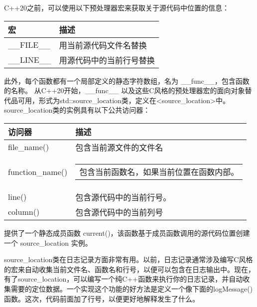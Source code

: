 

C++20之前，可以使用以下预处理器宏来获取关于源代码中位置的信息：

\begin{longtable}{|l|l|}
\hline
\textbf{宏} & \textbf{描述}                                     \\ \hline
\endfirsthead
%
\endhead
%
\_\_FILE\_\_   & 用当前源代码文件名替换
           \\ \hline
\_\_LINE\_\_   & 用源代码中的当前行号替换
 \\ \hline
\end{longtable}

此外，每个函数都有一个局部定义的静态字符数组，名为 \_\_func\_\_，包含函数的名称。
从C++20开始，\_\_func\_\_ 以及这些C风格的预处理器宏的面向对象替代品可用，形式为std::source\_location类，定义在<source\_location>中。source\_location类的实例具有以下公共访问器：


\begin{longtable}{|l|l|}
\hline
\textbf{访问器} & \textbf{描述}                                  \\ \hline
\endfirsthead
%
\endhead
%
file\_name()      & 包含当前源文件的文件名             \\ \hline
function\_name() & \begin{tabular}[c]{@{}l@{}}包含当前函数名，如果当前位置在函数内部。
\end{tabular} \\ \hline
line()            & 包含源代码中的当前行号。
  \\ \hline
column()          & 包含源代码中的当前列号
 \\ \hline
\end{longtable}

提供了一个静态成员函数 current()，该函数基于成员函数调用的源代码位置创建一个 source\_location 实例。


source\_location类在日志记录方面非常有用。以前，日志记录通常涉及编写C风格的宏来自动收集当前文件名、函数名和行号，以便可以包含在日志输出中。现在，有了source\_location，可以编写一个纯C++函数来执行你的日志记录，并自动收集需要的定位数据。一个实现这个功能的好方法是定义一个像下面的logMessage()函数。这次，代码前面加了行号，以便更好地解释发生了什么。

